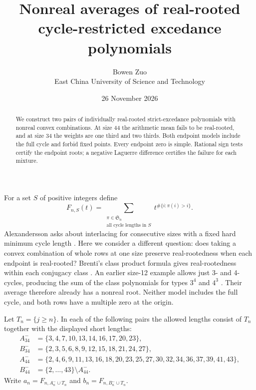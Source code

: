 \documentclass[11pt]{article}
\title{Nonreal averages of real-rooted cycle-restricted excedance polynomials}
\author{Bowen Zuo\\ {\small East China University of Science and Technology}}
\date{26 November 2026}
\begin{document}
\maketitle
\begin{abstract}
We construct two pairs of individually real-rooted strict-excedance polynomials with nonreal convex combinations. At size 44 the arithmetic mean fails to be real-rooted, and at size 34 the weights are one third and two thirds. Both endpoint models include the full cycle and forbid fixed points. Every endpoint zero is simple. Rational sign tests certify the endpoint roots; a negative Laguerre difference certifies the failure for each mixture.
\end{abstract}

For a set $S$ of positive integers define
\[
 F_{n,S}(t)=\sum_{\substack{\pi\in\mathfrak S_n\\\text{all cycle lengths in }S}}
 t^{\#\{i:\pi(i)>i\}}.
\]
Alexandersson asks about interlacing for consecutive sizes with a fixed hard minimum cycle length \cite{alex}. Here we consider a different question: does taking a convex combination of whole rows at one size preserve real-rootedness when each endpoint is real-rooted? Brenti's class product formula gives real-rootedness within each conjugacy class \cite[Theorems 3.1--3.2]{brenti}. An earlier size-12 example allows just 3- and 4-cycles, producing the sum of the class polynomials for types $3^4$ and $4^3$ \cite{earlier}. Their average therefore already has a nonreal root. Neither model includes the full cycle, and both rows have a multiple zero at the origin.

Let $T_n=\{j\ge n\}$. In each of the following pairs the allowed lengths consist of $T_n$ together with the displayed short lengths:
\[
\begin{aligned}
 A_{34}^- &= \{3,4,7,10,13,14,16,17,20,23\},\\
 B_{34}^- &= \{2,3,5,6,8,9,12,15,18,21,24,27\},\\
 A_{44}^- &= \{2,4,6,9,11,13,16,18,20,23,25,27,30,32,34,36,37,39,41,43\},\\
 B_{44}^- &= \{2,\ldots,43\}\setminus A_{44}^-.
\end{aligned}
\]
Write $a_n=F_{n,A_n^-\cup T_n}$ and $b_n=F_{n,B_n^-\cup T_n}$.
\end{document}
